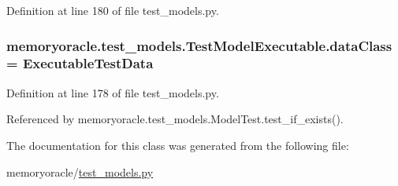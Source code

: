 Definition at line 180 of file test\+\_\+models.\+py.

\hypertarget{classmemoryoracle_1_1test__models_1_1TestModelExecutable_ad9b1511190d67f452ce013ad16d53e0f}{}
\subsubsection[{data\+Class}]{\setlength{\rightskip}{0pt plus 5cm}memoryoracle.\+test\+\_\+models.\+Test\+Model\+Executable.\+data\+Class = {\bf Executable\+Test\+Data}\hspace{0.3cm}{\ttfamily [static]}}\label{classmemoryoracle_1_1test__models_1_1TestModelExecutable_ad9b1511190d67f452ce013ad16d53e0f}


Definition at line 178 of file test\+\_\+models.\+py.



Referenced by memoryoracle.\+test\+\_\+models.\+Model\+Test.\+test\+\_\+if\+\_\+exists().



The documentation for this class was generated from the following file\+:\begin{DoxyCompactItemize}
\item 
memoryoracle/\hyperlink{test__models_8py}{test\+\_\+models.\+py}\end{DoxyCompactItemize}
